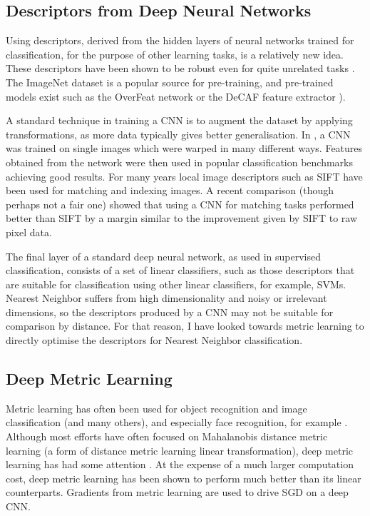\subsection {Descriptors from Deep Neural Networks}

Using descriptors, derived from the hidden layers of neural networks trained for classification, for the purpose of other learning tasks, is a relatively new idea. These descriptors have been shown to be robust even for quite unrelated tasks \cite{Donahue2014,Razavian2014}. The ImageNet dataset \cite{Krizhevsky2012} is a popular source for pre-training, and pre-trained models exist such as the OverFeat network \cite{Sermanet2013} or the DeCAF feature extractor \cite{Donahue2014}). 

A standard technique in training a \gls{CNN} is to augment the dataset by applying transformations, as more data typically gives better generalisation. In \cite{Dosovitskiy2013}, a \gls{CNN} was trained on single images which were warped in many different ways. Features obtained from the network were then used in popular classification benchmarks achieving good results. For many years local image descriptors such as \gls{SIFT} \cite{Lowe2004} have been used for matching and indexing images.  A recent comparison \cite{Fischer2014} (though perhaps not a fair one) showed that using a \gls{CNN} for matching tasks performed better than \gls{SIFT} by a margin similar to the improvement given by \gls{SIFT} to raw pixel data.


The final layer of a standard deep neural network, as used in supervised classification, consists of a set of linear classifiers, such as those descriptors that are suitable for classification using other linear classifiers, for example, \gls{SVM}s. Nearest Neighbor suffers from high dimensionality and noisy or irrelevant dimensions, so the descriptors produced by a CNN may not be suitable for comparison by distance. For that reason, I have looked towards metric learning to directly optimise the descriptors for Nearest Neighbor classification. 


\subsection {Deep Metric Learning}


Metric learning has often been used for object recognition and image classification \cite{Hadsell2006,Min2009} (and many others), and especially face recognition, for example \cite{Kostinger2012}. Although most efforts have often focused on Mahalanobis distance metric learning (a form of distance metric learning linear transformation), deep metric learning has had some attention \cite {Salakhutdinov2007a,Min2009,Weston2009,Min2010}. At the expense of a much larger computation cost, deep metric learning has been shown to perform much better than its linear counterparts. Gradients from metric learning are used to drive \gls{SGD} on a deep \gls{CNN}. 

